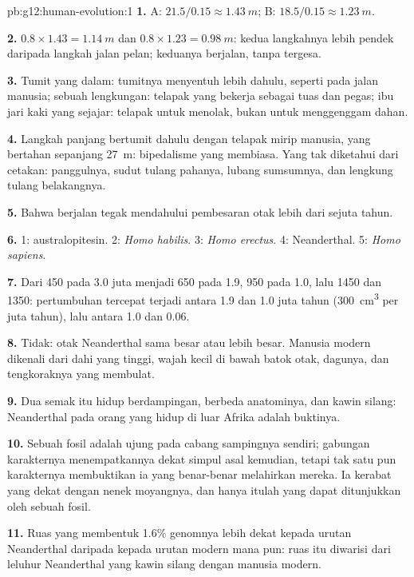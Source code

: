 \begin{solution}{pb:g12:human-evolution:1}
\textbf{1.} A: $21.5/0.15 \approx \qty{1.43}{m}$; B: $18.5/0.15
\approx \qty{1.23}{m}$.

\textbf{2.} $0.8 \times 1.43 = \qty{1.14}{m}$ dan $0.8 \times 1.23 =
\qty{0.98}{m}$: kedua langkahnya lebih pendek daripada langkah jalan
pelan; keduanya berjalan, tanpa tergesa.

\textbf{3.} Tumit yang dalam: tumitnya menyentuh lebih dahulu, seperti
pada jalan manusia; sebuah lengkungan: telapak yang bekerja sebagai
tuas dan pegas; ibu jari kaki yang sejajar: telapak untuk menolak,
bukan untuk menggenggam dahan.

\textbf{4.} Langkah panjang bertumit dahulu dengan telapak mirip
manusia, yang bertahan sepanjang \qty{27}{m}: bipedalisme yang
membiasa. Yang tak diketahui dari cetakan: panggulnya, sudut tulang
pahanya, lubang sumsumnya, dan lengkung tulang belakangnya.

\textbf{5.} Bahwa berjalan tegak mendahului pembesaran otak lebih dari
sejuta tahun.

\textbf{6.} 1: australopitesin. 2: \emph{Homo habilis}. 3: \emph{Homo
erectus}. 4: Neanderthal. 5: \emph{Homo sapiens}.

\textbf{7.} Dari 450 pada 3.0 juta menjadi 650 pada 1.9, 950 pada 1.0,
lalu 1450 dan 1350: pertumbuhan tercepat terjadi antara 1.9 dan 1.0
juta tahun (\qty{300}{cm^3} per juta tahun), lalu antara 1.0 dan 0.06.

\textbf{8.} Tidak: otak Neanderthal sama besar atau lebih besar.
Manusia modern dikenali dari dahi yang tinggi, wajah kecil di bawah
batok otak, dagunya, dan tengkoraknya yang membulat.

\textbf{9.} Dua  semak itu hidup berdampingan, berbeda
anatominya, dan kawin silang:  Neanderthal pada orang yang hidup di
luar Afrika adalah buktinya.

\textbf{10.} Sebuah fosil adalah ujung pada cabang sampingnya sendiri;
gabungan karakternya menempatkannya dekat simpul asal 
kemudian, tetapi tak satu pun karakternya membuktikan ia  yang
benar-benar melahirkan mereka. Ia kerabat yang dekat dengan nenek
moyangnya, dan hanya itulah yang dapat ditunjukkan oleh sebuah fosil.

\textbf{11.} Ruas yang membentuk 1.6\% genomnya lebih dekat kepada
urutan Neanderthal daripada kepada urutan modern mana pun: ruas itu
diwarisi dari leluhur Neanderthal yang kawin silang dengan manusia
modern.


\end{solution}
